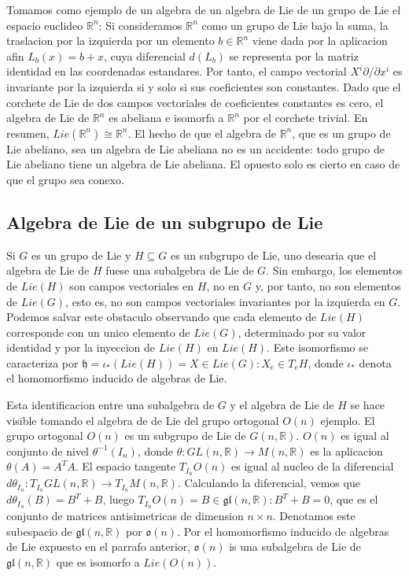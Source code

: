\documentclass[12pt]{extarticle}
\newcommand{\R}{\mathbb{R}}
\newcommand{\gl}{\mathfrak{g}\mathfrak{l}}
\newcommand{\<}{\langle}
\renewcommand{\>}{\rangle}
\theoremstyle{definition}
\begin{document}
Tomamos como ejemplo de un algebra de un algebra de Lie de un grupo de Lie el
espacio euclideo $\R^n$: Si consideramos $\R^n$ como un
grupo de Lie bajo la suma, la traslacion por la izquierda por un elemento $b \in
\R^n$ viene dada por la aplicacion afin $L_b(x) = b + x$, cuya diferencial
$d(L_b)$ se representa por la matriz identidad en las coordenadas estandares.
Por tanto, el campo vectorial $X^i \partial / \partial x^i$ es invariante por la
izquierda si y solo si sus coeficientes son constantes. Dado que el corchete de
Lie de dos campos vectoriales de coeficientes constantes es cero, el algebra de
Lie de $\R^n$ es abeliana e isomorfa a $\R^n$ por el corchete trivial. En
resumen, $Lie(\R^n) \cong \R^n$. El hecho de que el algebra de $\R^n$, que es un
grupo de Lie abeliano, sea un algebra de Lie abeliana no es un accidente: todo
grupo de Lie abeliano tiene un algebra de Lie abeliana. El opuesto solo es
cierto en caso de que el grupo sea conexo.



\subsection{Algebra de Lie de un subgrupo de Lie}
Si $G$ es un grupo de Lie y $H \subseteq G$ es un subgrupo de Lie, uno desearia
que el algebra de Lie de $H$ fuese una subalgebra de Lie de $G$. Sin embargo,
los elementos de $Lie(H)$ son campos vectoriales en $H$, no en $G$ y, por tanto,
no son elementos de $Lie(G)$, esto es, no son campos vectoriales invariantes por
la izquierda en $G$. Podemos salvar este obstaculo observando que cada elemento
de $Lie(H)$ corresponde con un unico elemento de $Lie(G)$, determinado por su
valor identidad y por la inyeccion de $Lie(H)$ en $Lie(H)$. Este isomorfismo se
caracteriza por $\mathfrak{h}=\iota_*(Lie(H)) = { X \in Lie(G): X_e \in T_eH}$,
donde $\iota_*$ denota el homomorfismo inducido de algebras de Lie.

Esta identificacion entre una subalgebra de $G$ y el algebra de Lie de $H$ se
hace visible tomando el algebra de de Lie del grupo ortogonal $O(n)$ ejemplo. El
grupo ortogonal $O(n)$ es un subgrupo de Lie de $G(n, \R)$. $O(n)$ es igual al
conjunto de nivel $\theta ^{-1}(I_n)$, donde $\theta : GL(n, \R) \rightarrow
M(n, \R)$ es la aplicacion $\theta(A) = A^TA$. El espacio tangente $T_{I_n}O(n)$
es igual al nucleo de la diferencial $d\theta_{I_n} : T_{I_n}GL(n, \R)
\rightarrow T_{I_n}M(n, \R)$. Calculando la diferencial, vemos que
$d\theta_{I_n}(B) = B^T + B$, luego $T_{I_n}O(n) = {B \in
\gl(n, \R): B^T + B = 0}$, que es el conjunto de matrices
antisimetricas de dimension $n \times n$. Denotamos este subespacio de $\gl(n,
\R)$ por $\mathfrak{o}(n)$. Por el homomorfismo inducido de algebras de Lie
expuesto en el parrafo anterior,
$\mathfrak{o}(n)$ is una subalgebra de Lie de $\gl(n, \R)$ que es isomorfo a
$Lie(O(n))$.
\end{document}
